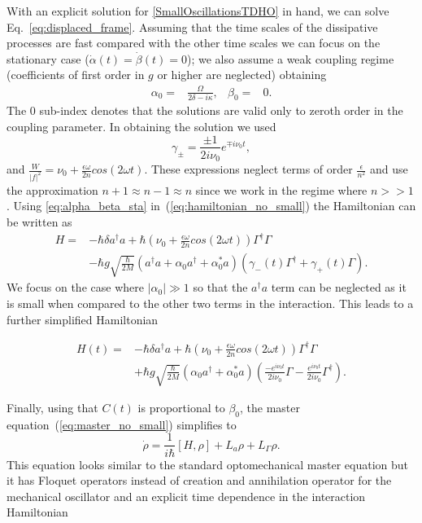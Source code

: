 \documentclass[reprint, amsmath,amssymb, aps,pra]{revtex4-1}
\begin{document}
With an explicit solution for \eqref{SmallOscillationsTDHO} in hand,
we can solve Eq.~\eqref{eq:displaced_frame}. Assuming that the time
scales of the dissipative processes are fast compared with the other
time scales we can focus on the stationary case
($\dot{\alpha}(t)=\dot{\beta}(t)=0$); we also assume a weak coupling
regime (coefficients of first order in $g$ or higher are neglected)
obtaining
\begin{align}\label{eq:alpha_beta_sta}
\alpha_0 =& \frac{\Omega}{2\delta-i\kappa},& \beta_0 =& 0.
\end{align}
The 0 sub-index denotes that the solutions are valid only to zeroth
order in the coupling parameter. In obtaining the solution we used
\begin{equation}\label{GammaCoefficients}
\gamma_\pm= \frac{\pm 1}{2i\nu_0}e^{\mp i\nu_0 t},
\end{equation}
and  $\frac{W}{|f|^2} = \nu_0 + \frac{\epsilon \omega}{2n} cos(2\omega t)$. These expressions neglect terms of order $\frac{\epsilon}{n^2}$ and use the approximation $n+1 \approx n-1 \approx n$ since we work in the regime where $n >> 1$. Using \eqref{eq:alpha_beta_sta} in~(\ref{eq:hamiltonian_no_small})
the Hamiltonian can be written as
\begin{align}
H =& -\hbar \delta a^{\dagger}a +\hbar(\nu_0 + \frac{\epsilon \omega}{2n} cos(2\omega t))\Gamma^{\dagger}\Gamma \\
&-\hbar g\sqrt{\frac{\hbar}{2M}}(a^{\dagger}a +\alpha_0 a^{\dagger}+\alpha^*_0 a)(\gamma_-(t)\Gamma^{\dagger}+\gamma_+(t)\Gamma)\nonumber.
\end{align}
We focus on the case where $|\alpha_0| \gg 1$
\cite{BarberisLC} so that the $a^\dagger a$ term can be neglected as
it is small when compared to the other two terms in the interaction.
This leads to a further simplified Hamiltonian

\begin{align} \label{LCHamiltonian}
H(t) =& -\hbar \delta a^{\dagger}a +\hbar(\nu_0 + \frac{\epsilon \omega}{2n} cos(2\omega t))\Gamma^{\dagger}\Gamma \\
&+\hbar g\sqrt{\frac{\hbar}{2M}}(\alpha_0 a^{\dagger}+\alpha^*_0 a)(\frac{-e^{i\nu_0 t}}{2i\nu_0}\Gamma-\frac{
e^{i\nu_0 t}}{2i\nu_0} \nonumber\Gamma^{\dagger}).
\end{align}

Finally, using that $C(t)$ is proportional to $\beta_0$, the master
equation~(\ref{eq:master_no_small}) simplifies to
\begin{equation}\label{LCMasterEq}
\dot{\rho} = \frac{1}{i\hbar}[H,\rho] +L_a\rho + L_\Gamma \rho.
\end{equation}
This equation looks similar to the standard optomechanical master
equation but it has Floquet operators instead of creation and
annihilation operator for the mechanical oscillator and an explicit
time dependence in the interaction Hamiltonian
\end{document}
